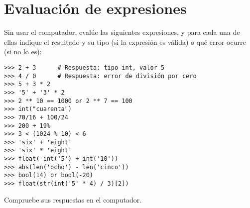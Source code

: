 \section{Evaluación de expresiones}

Sin usar el computador, evalúe las siguientes expresiones, y para cada
una de ellas indique el resultado y su tipo (si la expresión es válida)
o qué error ocurre (si no lo es):

\begin{lstlisting}
>>> 2 + 3      # Respuesta: tipo int, valor 5
>>> 4 / 0      # Respuesta: error de división por cero
>>> 5 + 3 * 2
>>> '5' + '3' * 2
>>> 2 ** 10 == 1000 or 2 ** 7 == 100
>>> int("cuarenta")
>>> 70/16 + 100/24
>>> 200 + 19%
>>> 3 < (1024 % 10) < 6
>>> 'six' + 'eight'
>>> 'six' * 'eight'
>>> float(-int('5') + int('10'))
>>> abs(len('ocho') - len('cinco'))
>>> bool(14) or bool(-20)
>>> float(str(int('5' * 4) / 3)[2])
\end{lstlisting}

Compruebe sus respuestas en el computador.

